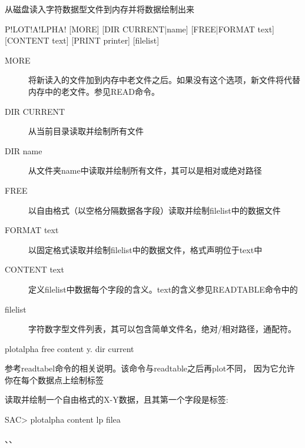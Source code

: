 \label{cmd:plotalpha}

从磁盘读入字符数据型文件到内存并将数据绘制出来

\begin{SACSTX}
P!LOT!A!LPHA! [MORE] [DIR CURRENT|name] [FREE|FORMAT text] [CONTENT text]
    [PRINT printer] [filelist]
\end{SACSTX}

\begin{description}
\item [MORE] 将新读入的文件加到内存中老文件之后。如果没有这个选项，新文件将代替内存中的老文件。参见READ命令。
\item [DIR CURRENT] 从当前目录读取并绘制所有文件
\item [DIR name] 从文件夹name中读取并绘制所有文件，其可以是相对或绝对路径
\item [FREE] 以自由格式（以空格分隔数据各字段）读取并绘制filelist中的数据文件
\item [FORMAT text] 以固定格式读取并绘制filelist中的数据文件，格式声明位于text中
\item [CONTENT text] 定义filelist中数据每个字段的含义。text的含义参见READTABLE命令中的
\item [filelist] 字符数字型文件列表，其可以包含简单文件名，绝对/相对路径，通配符。
\end{description}

\begin{SACDFT}
plotalpha free content y. dir current
\end{SACDFT}

参考readtabel命令的相关说明。该命令与readtable之后再plot不同，
因为它允许你在每个数据点上绘制标签

读取并绘制一个自由格式的X-Y数据，且其第一个字段是标签:
\begin{SACCode}
SAC> plotalpha content lp filea
\end{SACCode}

、、
